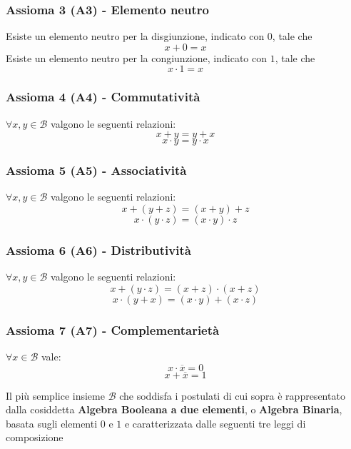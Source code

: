 \documentclass[a4paper]{extarticle}
\begin{document}
\subsubsection{Assioma 3 (A3) - Elemento neutro}
Esiste un elemento neutro per la disgiunzione, indicato con \(0\), tale che
\[x + 0 = x\]
Esiste un elemento neutro per la congiunzione, indicato con \(1\), tale che
\[x \cdot 1 = x\]

\subsubsection{Assioma 4 (A4) - Commutatività}
\(\forall x, y \in \mathcal{B}\) valgono le seguenti relazioni:
\[x + y = y + x\]
\[x \cdot y = y \cdot x\]

\subsubsection{Assioma 5 (A5) - Associatività}
\(\forall x, y \in \mathcal{B}\) valgono le seguenti relazioni:
\[x + (y + z) = (x + y) + z\]
\[x \cdot (y \cdot z) = (x \cdot y) \cdot z\]

\subsubsection{Assioma 6 (A6) - Distributività}
\(\forall x, y \in \mathcal{B}\) valgono le seguenti relazioni:
\[x + (y \cdot z) = (x+ z) \cdot (x + z)\]
\[x \cdot (y + x) = (x \cdot y) + (x \cdot z)\]

\subsubsection{Assioma 7 (A7) - Complementarietà}
\(\forall x \in \mathcal{B}\) vale:
\[x \cdot \overline{x} = 0\]
\[x + \overline{x} = 1\]

\vspace{1em}
\noindent
Il più semplice insieme \(\mathcal{B}\) che soddisfa i postulati di cui sopra è rappresentato dalla cosiddetta \textbf{Algebra Booleana a due elementi}, o \textbf{Algebra Binaria}, basata sugli elementi \(0\) e \(1\) e caratterizzata dalle seguenti tre leggi di composizione
\end{document}
